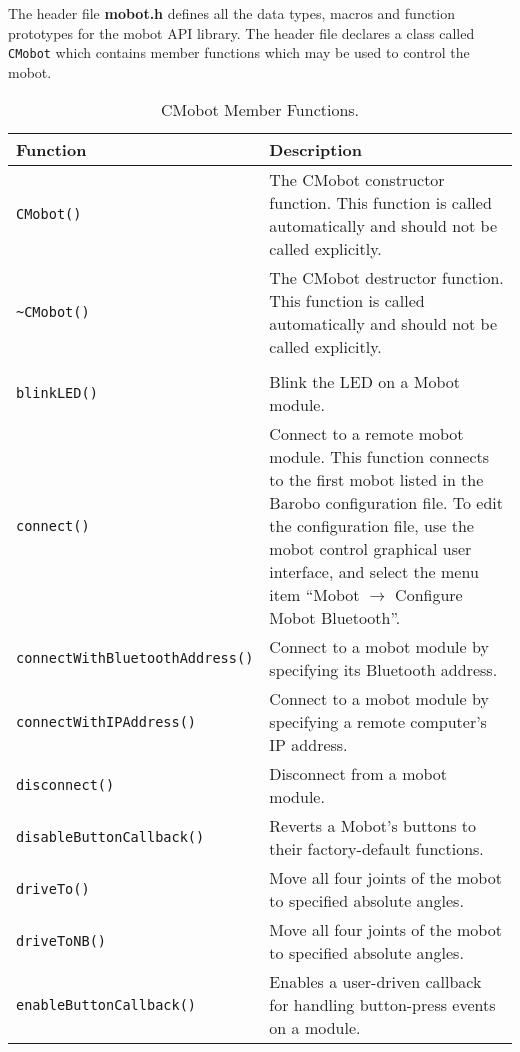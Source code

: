 \noindent
The header file {\bf mobot.h} defines all the data types, macros 
and function prototypes for the mobot API library. The header file
declares a class called \texttt{CMobot} which contains member functions which
may be used to control the mobot.

\begin{table}[!h]
\begin{center}
\caption{CMobot Member Functions.}
\begin{tabular}{p{48 mm}p{110 mm}}
\hline
Function & Description \\
\hline
\texttt{CMobot()} & The CMobot constructor function. This function
is called automatically and should not be called explicitly. \\
\texttt{\textasciitilde CMobot()} & The CMobot destructor function. This function
is called automatically and should not be called explicitly. \\
& \\
\texttt{blinkLED()} & Blink the LED on a Mobot module. \\
\texttt{connect()} & Connect to a remote mobot module. This function 
connects to the first mobot listed in the Barobo configuration file. To
edit the configuration file, use the mobot control graphical user interface,
and select the menu item ``Mobot $\rightarrow$ Configure Mobot Bluetooth''. \\
\texttt{connectWithBluetoothAddress()} & Connect to a mobot module by specifying its Bluetooth address. \\
\texttt{connectWithIPAddress()} & Connect to a mobot module by specifying a remote computer's IP address. \\
\texttt{disconnect()} & Disconnect from a mobot module. \\
\texttt{disableButtonCallback()} & Reverts a Mobot's buttons to their factory-default functions. \\
\texttt{driveTo()} & Move all four joints of the mobot to specified absolute angles. \\
\texttt{driveToNB()} & Move all four joints of the mobot to specified absolute angles. \\
\texttt{enableButtonCallback()} & Enables a user-driven callback for handling button-press events on a module. \\

\end{tabular}
\end{center}
\end{table}
